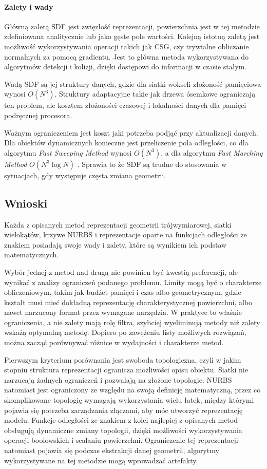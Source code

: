 \paragraph{Zalety i wady}
Główną zaletą SDF jest zwięzłość reprezentacji, powierzchnia jest w tej metodzie zdefiniowana analitycznie lub jako gęste pole wartości. Kolejną istotną zaletą jest możliwość wykorzystywania operacji takich jak CSG, czy trywialne obliczanie normalnych za pomocą gradientu. Jest to główna metoda wykorzystywana do algorytmów detekcji i kolizji, dzięki dostępowi do informacji w czasie stałym.

Wadą SDF są jej struktury danych, gdzie dla siatki wokseli złożoność pamięciowa wynosi $O(N^3)$. Struktury adaptacyjne takie jak drzewa ósemkowe ograniczają ten problem, ale kosztem złożoności czasowej i lokalności danych dla pamięci podręcznej procesora.

Ważnym ograniczeniem jest koszt jaki potrzeba podjąć przy aktualizacji danych. Dla obiektów dynamicznych konieczne jest przeliczenie pola odległości, co dla algorytmu \textit{Fast Sweeping Method} wynosi $O(N^3)$, a dla algorytmu \textit{Fast Marching Method} $O(N^3 \log N)$ \cite{sethian1999}. Sprawia to że SDF są trudne do stosowania w sytuacjach, gdy występuje częsta zmiana geometrii.

\subsection{Wnioski}
\label{sec:wnioski}

Każda z opisanych metod reprezentacji geometrii trójwymiarowej, siatki wielokątów, krzywe NURBS i reprezentacje oparte na funkcjach odległości ze znakiem posiadają swoje wady i zalety, które są wynikiem ich podstaw matematycznych. 

Wybór jednej z metod nad drugą nie powinien być kwestią preferencji, ale wynikać z analizy ograniczeń podanego problemu. Limity mogą być o charakterze obliczeniowym, takim jak budżet pamięci i czas albo geometrycznym, gdzie kształt musi mieć dokładną reprezentację charakterystycznej powierzchni, albo nawet narzucony format przez wymagane narzędzia. W praktyce to właśnie ograniczenia, a nie zalety mają rolę filtra, szybciej wyeliminują metody niż zalety wskażą optymalną metodę. Dopiero po zawężeniu listy możliwych rozwiązań, można zacząć porównywać różnice w wydajności i charakterze metod.

Pierwszym kryterium porównania jest swoboda topologiczna, czyli w jakim stopniu struktura reprezentacji ogranicza możliwości opisu obiektu. Siatki nie narzucają żadnych ograniczeń i pozwalają na złożone topologie. NURBS natomiast jest ograniczony ze względu na swoją definicję matematyczną, przez co skomplikowane topologię wymagają wykorzystania wielu łatek, między którymi pojawia się potrzeba zarządzania złączami, aby móc utworzyć reprezentację modelu. Funkcje odległości ze znakiem z kolei najlepiej z opisanych metod obsługują dynamiczne zmiany topologii, dzięki możliwości wykorzystywania operacji boolowskich i scalaniu powierzchni. Ograniczenie tej reprezentacji natomiast pojawia się podczas ekstrakcji danej geometrii, algorytmy wykorzystywane na tej metodzie mogą wprowadzać artefakty.

